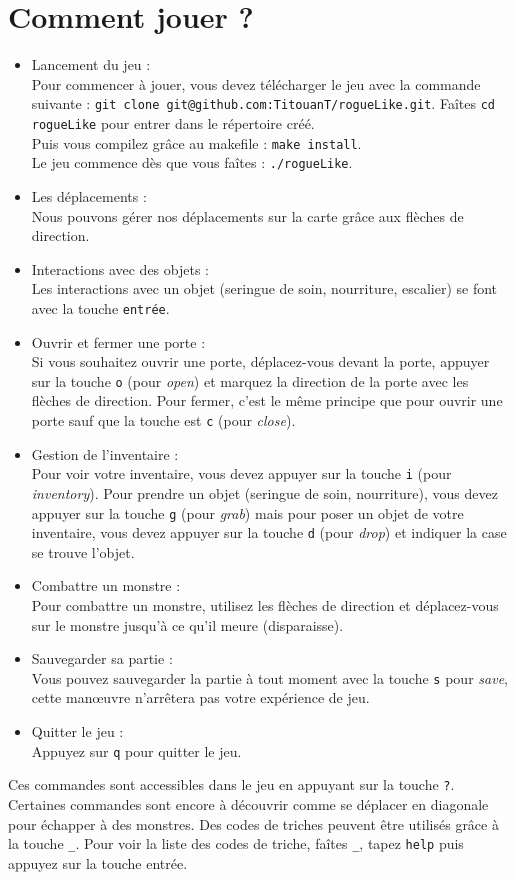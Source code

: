 \documentclass[11pt]{report}
\begin{document}
	\section{Comment jouer ?}
		\begin{itemize}
			\item{Lancement du jeu : \\}
				Pour commencer à jouer, vous devez télécharger le jeu avec la commande suivante : \texttt{git clone git@github.com:TitouanT/rogueLike.git}.
				Faîtes \texttt{cd rogueLike} pour entrer dans le répertoire créé. \\
				Puis vous compilez grâce au makefile : \texttt{make install}. \\
				Le jeu commence dès que vous faîtes : \texttt{./rogueLike}.	
			\item{Les déplacements : \\}
				Nous pouvons gérer nos déplacements sur la carte grâce aux flèches de direction. 
			\item{Interactions avec des objets : \\}	
				Les interactions avec un objet (seringue de soin, nourriture, escalier) se font avec la touche \texttt{entrée}.
			\item{Ouvrir et fermer une porte :\\}	
				Si vous souhaitez ouvrir une porte, déplacez-vous devant la porte, appuyer sur la touche \texttt{o} (pour \emph{open}) et marquez la direction de la porte avec les flèches de direction.
				Pour fermer, c'est le même principe que pour ouvrir une porte sauf que la touche est \texttt{c} (pour \emph{close}).
			\item{Gestion de l'inventaire : \\}
				Pour voir votre inventaire, vous devez appuyer sur la touche \texttt{i} (pour \emph{inventory}). Pour prendre un objet (seringue de soin, nourriture), vous devez appuyer sur la touche \texttt{g} (pour \emph{grab}) mais pour poser un objet de votre inventaire, vous devez appuyer sur la touche \texttt{d} (pour \emph{drop}) et indiquer la case se trouve l'objet.
			\item{Combattre un monstre :\\}
				Pour combattre un monstre, utilisez les flèches de direction et déplacez-vous sur le monstre jusqu'à ce qu'il meure (disparaisse).
			\item{Sauvegarder sa partie :\\}
				Vous pouvez sauvegarder la partie à tout moment avec la touche \texttt{s} pour \emph{save}, cette manœuvre n'arrêtera pas votre expérience de jeu.
			\item{Quitter le jeu :\\}
				Appuyez sur \texttt{q} pour quitter le jeu.
		\end{itemize}
		Ces commandes sont accessibles dans le jeu en appuyant sur la touche \texttt{?}.
		Certaines commandes sont encore à découvrir comme se déplacer en diagonale pour échapper à des monstres. Des codes de triches peuvent être utilisés grâce à la touche \texttt{\_}. Pour voir la liste des codes de triche, faîtes \texttt{\_}, tapez \texttt{help} puis appuyez sur la touche entrée.
		
\end{document}

